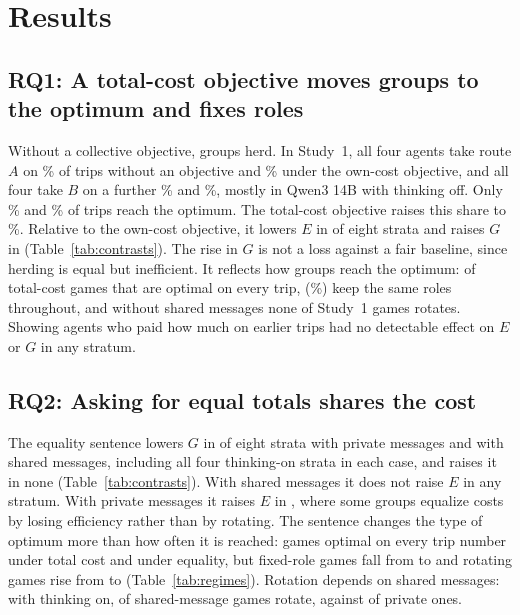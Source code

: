 \documentclass[11pt]{article}
\begin{document}
\section{Results}
\label{sec:results}
\subsection{RQ1: A total-cost objective moves groups to the optimum and fixes roles}
Without a collective objective, groups herd. In Study~1, all four agents take route $A$ on \HerdNoObjA\% of trips without an objective and \HerdSelfA\% under the own-cost objective, and all four take $B$ on a further \HerdNoObjB\% and \HerdSelfB\%, mostly in Qwen3 14B with thinking off. Only \SOTripNoObj\% and \SOTripSelf\% of trips reach the optimum. The total-cost objective raises this share to \SOTripSocial\%. Relative to the own-cost objective, it lowers $E$ in \SOneSocSelfE{} of eight strata and raises $G$ in \SOneSocSelfG{} (Table~\ref{tab:contrasts}). The rise in $G$ is not a loss against a fair baseline, since herding is equal but inefficient. It reflects how groups reach the optimum: of \SOneSocialSO{} total-cost games that are optimal on every trip, \SOneSocialFixed{} (\SOneSocialFixedPct\%) keep the same roles throughout, and without shared messages none of \SOnePrivateGames{} Study~1 games rotates. Showing agents who paid how much on earlier trips had no detectable effect on $E$ or $G$ in any stratum.

\begin{table}[t]
\centering\small
\resizebox{\columnwidth}{!}{}
\caption{Pre-specified contrasts. Open models: number of the eight model--mode strata in which the adjusted interval shows a decrease\,/\,increase. Luna: direction in each reasoning mode ($\downarrow$ decrease, $\uparrow$ increase, $\cdot$ inconclusive). Study~1 contrasts average over the other factors.}
\label{tab:contrasts}
\end{table}

\subsection{RQ2: Asking for equal totals shares the cost}
The equality sentence lowers $G$ in \FairPrivG{} of eight strata with private messages and \FairTextG{} with shared messages, including all four thinking-on strata in each case, and raises it in none (Table~\ref{tab:contrasts}). With shared messages it does not raise $E$ in any stratum. With private messages it raises $E$ in \FairPrivEInc, where some groups equalize costs by losing efficiency rather than by rotating. The sentence changes the type of optimum more than how often it is reached: games optimal on every trip number \STwoSocSO{} under total cost and \STwoFairSO{} under equality, but fixed-role games fall from \STwoSocFixed{} to \STwoFairFixed{} and rotating games rise from \STwoSocRot{} to \STwoFairRot{} (Table~\ref{tab:regimes}). Rotation depends on shared messages: with thinking on, \STwoFairTextOnRot{} of \STwoFairTextOnGames{} shared-message games rotate, against \STwoFairPrivOnRot{} of \STwoFairPrivOnGames{} private ones.
\end{document}
